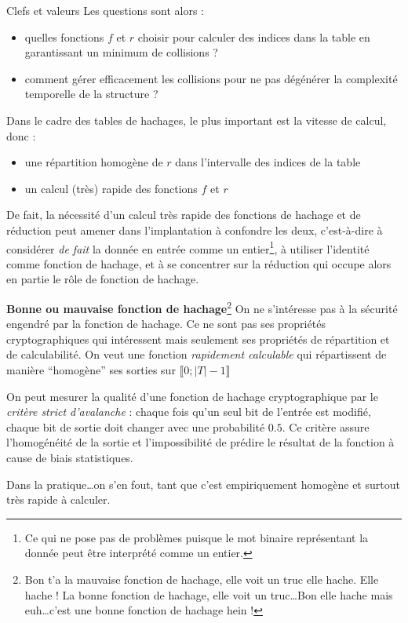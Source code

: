 \documentclass[../../../main.tex]{subfiles}
\begin{document}
\begin{definition}{Clefs et valeurs}
Les questions sont alors :
\begin{itemize}
	\item quelles fonctions $f$ et $r$ choisir pour calculer des indices dans la table en garantissant un minimum de collisions ?
	\item comment gérer efficacement les collisions pour ne pas dégénérer la complexité temporelle de la structure ? 
\end{itemize}
Dans le cadre des tables de hachages, le plus important est la vitesse de calcul, donc :
\begin{itemize}
	\item une répartition homogène de $r$ dans l'intervalle des indices de la table
	\item un calcul (très) rapide des fonctions $f$ et $r$
\end{itemize}
De fait, la nécessité d'un calcul très rapide des fonctions de hachage et de réduction peut amener dans l'implantation à confondre les deux, c'est-à-dire à considérer \textit{de fait} la donnée en entrée comme un entier\footnote{Ce qui ne pose pas de problèmes puisque le mot binaire représentant la donnée peut être interprété comme un entier.}, à utiliser l'identité comme fonction de hachage, et à se concentrer sur la réduction qui occupe alors en partie le rôle de fonction de hachage.

\begin{minitelbasicbox}{\textbf{Bonne ou mauvaise fonction de hachage}\footnote{Bon t'a la mauvaise fonction de hachage, elle voit un truc elle hache. Elle hache ! La bonne fonction de hachage, elle voit un truc\dots Bon elle hache mais euh\dots c'est une bonne fonction de hachage hein !}}
On ne s'intéresse pas à la sécurité engendré par la fonction de hachage. Ce ne sont pas ses propriétés cryptographiques qui intéressent mais seulement ses propriétés de répartition et de calculabilité. On veut une fonction \textit{rapidement calculable} qui répartissent de manière ``homogène'' ses sorties sur $\llbracket 0; |T| - 1\rrbracket$ \newline

On peut mesurer la qualité d'une fonction de hachage cryptographique par le \textit{critère strict d'avalanche} : chaque fois qu'un seul bit de l'entrée est modifié, chaque bit de sortie doit changer avec une probabilité $0.5$. Ce critère assure l'homogénéité de la sortie et l'impossibilité de prédire le résultat de la fonction à cause de biais statistiques.

Dans la pratique\dots on s'en fout, tant que c'est empiriquement homogène et surtout très rapide à calculer.
\end{minitelbasicbox}

\end{definition}
\end{document}

